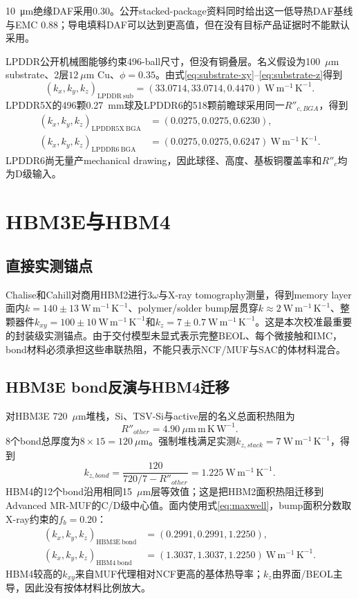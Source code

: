 \documentclass[UTF8,zihao=-4]{ctexart}
\newcommand{\kxyz}{(k_x,k_y,k_z)}
\newcommand{\unitk}{\mathrm{W\,m^{-1}\,K^{-1}}}
\begin{document}
\SI{10}{\micro\metre}绝缘DAF采用\SI{0.30}{\tcond}。公开stacked-package资料同时给出这一低导热DAF基线与EMC \SI{0.88}{\tcond}\cite{KimYooPatent2026}；导电填料DAF可以达到更高值，但在没有目标产品证据时不能默认采用。

LPDDR公开机械图能够约束496-ball尺寸\cite{MicronLPDDR5}，但没有铜叠层。名义假设为100~$\mu\mathrm{m}$ substrate、2层$12~\mu\mathrm{m}$ Cu、$\phi=0.35$。由式\eqref{eq:substrate-xy}--\eqref{eq:substrate-z}得到
\begin{equation}
  \kxyz_{\mathrm{LPDDR\ sub}}=(33.0714,33.0714,0.4470)~\unitk.
\end{equation}
LPDDR5X的496颗\SI{0.27}{mm}球及LPDDR6的518颗前瞻球采用同一$R''_{c,BGA}$，得到
\begin{align}
  \kxyz_{\mathrm{LPDDR5X\ BGA}}&=(0.0275,0.0275,0.6230),\\
  \kxyz_{\mathrm{LPDDR6\ BGA}}&=(0.0275,0.0275,0.6247)~\unitk.
\end{align}
LPDDR6尚无量产mechanical drawing，因此球径、高度、基板铜覆盖率和$R''_c$均为D级输入。

\section{HBM3E与HBM4}

\subsection{直接实测锚点}

Chalise和Cahill对商用HBM2进行3$\omega$与X-ray tomography测量，得到memory layer面内$k=140\pm13~\unitk$、polymer/solder bump层贯穿$k\approx2~\unitk$、整颗器件$k_{xy}=100\pm10~\unitk$和$k_z=7\pm0.7~\unitk$\cite{ChaliseCahill2023}。这是本次校准最重要的封装级实测锚点。由于交付模型未显式表示完整BEOL、每个微接触和IMC，bond材料必须承担这些串联热阻，不能只表示NCF/MUF与SAC的体材料混合。

\subsection{HBM3E bond反演与HBM4迁移}

对HBM3E 720~$\mu\mathrm{m}$堆栈，Si、TSV-Si与active层的名义总面积热阻为
\begin{equation}
  R''_{other}=4.90~\mu\mathrm{m\,m\,K\,W^{-1}}.
\end{equation}
8个bond总厚度为$8\times15=120~\mu\mathrm{m}$。强制堆栈满足实测$k_{z,stack}=7~\unitk$，得到
\begin{equation}
  k_{z,bond}=\frac{120}{720/7-R''_{other}}=1.225~\unitk.
  \label{eq:hbm-bond-calibration}
\end{equation}
HBM4的12个bond沿用相同15~$\mu\mathrm{m}$层等效值；这是把HBM2面积热阻迁移到Advanced MR-MUF的C/D级中心值。面内使用式\eqref{eq:maxwell}，bump面积分数取X-ray约束的$f_b=0.20$：
\begin{align}
  \kxyz_{\mathrm{HBM3E\ bond}}&=(0.2991,0.2991,1.2250),\\
  \kxyz_{\mathrm{HBM4\ bond}}&=(1.3037,1.3037,1.2250)~\unitk.
\end{align}
HBM4较高的$k_{xy}$来自MUF代理相对NCF更高的基体热导率；$k_z$由界面/BEOL主导，因此没有按体材料比例放大。
\end{document}
